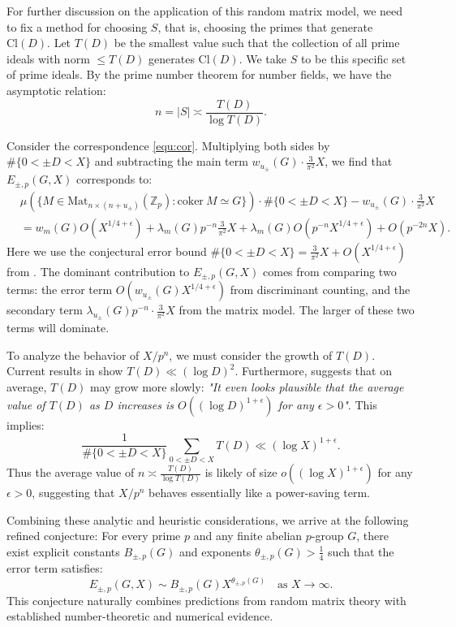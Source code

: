 \documentclass[a4]{amsart}
\newcommand{\Mat}{{\mathrm{Mat}}}
\newcommand{\Cl}{\mathrm{Cl}}
\newcommand{\coker}{\mathrm{coker~}}
\newcommand{\BZ}{{\mathbb {Z}}}
\theoremstyle{remark} \newtheorem{remark}[theorem]{Remark}
\begin{document}
For further discussion on the application of this random matrix model, we need to fix a method for choosing $S$, that is, choosing the primes that generate $\Cl(D)$. Let $T(D)$ be the smallest value such that the collection of all prime ideals with norm $\leq T(D)$ generates $\Cl(D)$. We take $S$ to be this specific set of prime ideals. By the prime number theorem for number fields, we have the asymptotic relation:
\[
n = |S| \asymp \frac{T(D)}{\log T(D)}.
\]

Consider the correspondence \eqref{equ:cor}. Multiplying both sides by $\#\{0 < \pm D < X\}$ and subtracting the main term $w_{u_\pm}(G)\cdot \frac{3}{\pi^2}X$, we find that $E_{\pm, p}(G, X)$ corresponds to:
\begin{align*}
&\mu\left(\{M \in \Mat_{n\times (n+u_\pm)}(\BZ_p) : \coker M \simeq G\}\right)\cdot\#\{0 < \pm D < X\} - w_{u_\pm}(G)\cdot \frac{3}{\pi^2}X \\
&= w_m(G)O(X^{1/4+\epsilon}) + \lambda_m(G)p^{-n}\frac{3}{\pi^2}X  + \lambda_m(G)O(p^{-n}X^{1/4+\epsilon}) + O(p^{-2n}X).
\end{align*}
Here we use the conjectural error bound $\#\{0 < \pm D < X\} = \frac{3}{\pi^2}X + O(X^{1/4+\epsilon})$ from \cite[Remark 1.1]{nunes2015Squarefree}. 
The dominant contribution to $E_{\pm, p}(G, X)$ comes from comparing two terms: the error term $O(w_{u_\pm}(G)X^{1/4+\epsilon})$ from discriminant counting, and the secondary term $\lambda_{u_\pm}(G)p^{-n}\cdot \frac{3}{\pi^2}X$ from the matrix model. 
The larger of these two terms will dominate.

To analyze the behavior of $X/p^n$, we must consider the growth of $T(D)$. 
Current results in \cite{kim2021Minimal} show $T(D) \ll (\log D)^2$. 
Furthermore, \cite{belabas2007Small} suggests that on average, $T(D)$ may grow more slowly: \textit{"It even looks plausible that the average value of $T(D)$ as $D$ increases is $O((\log D)^{1+\epsilon})$ for any $\epsilon>0$"}. This implies:
\[
\frac{1}{\#\{0 < \pm D < X\}}\sum_{0 < \pm D < X} T(D) \ll (\log X)^{1+\epsilon}.
\]
Thus the average value of $n \asymp \frac{T(D)}{\log T(D)} $ is likely of size $o((\log X)^{1+\epsilon})$ for any $\epsilon>0$, suggesting that $X/p^n$ behaves essentially like a power-saving term.





Combining these analytic and heuristic considerations, we arrive at the following refined conjecture: For every prime $p$ and any finite abelian $p$-group $G$, there exist explicit constants $B_{\pm,p}(G)$ and exponents $\theta_{\pm,p}(G) > \frac{1}{4}$ such that the error term satisfies:
\[
E_{\pm, p}(G, X) \sim B_{\pm,p}(G)X^{\theta_{\pm,p}(G)} \quad \text{as } X \to \infty.
\]
This conjecture naturally combines predictions from random matrix theory with established number-theoretic and numerical evidence.
\end{document}
